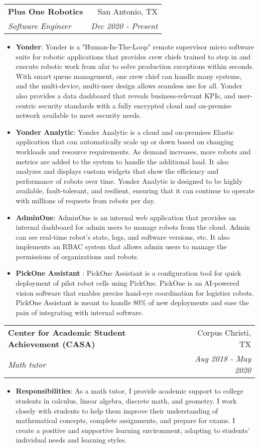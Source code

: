 \documentclass[letterpaper,11pt]{article}
\makeatletter
\newcommand{\resumeItem}[2]{
  \item\small{
    \textbf{#1}{: #2 \vspace{-2pt}}
  }
}
\newcommand{\resumeSubheading}[4]{
  \vspace{-1pt}\item
    \begin{tabular*}{0.97\textwidth}{l@{\extracolsep{\fill}}r}
      \textbf{#1} & #2 \\
      \textit{\small#3} & \textit{\small #4} \\
    \end{tabular*}\vspace{-5pt}
}
\newcommand{\resumeItemListStart}{\begin{itemize}}
\newcommand{\resumeItemListEnd}{\end{itemize}\vspace{-5pt}}
\makeatother
\begin{document}
    \resumeSubheading
      {Plus One Robotics}{San Antonio, TX}
      {Software Engineer}{Dec 2020 - Present}
      \resumeItemListStart
        \resumeItem{Yonder}
          {Yonder is a "Human-In-The-Loop" remote supervisor micro software suite for robotic applications that provides crew chiefs trained to step in and execute robotic work from afar to solve production exceptions within seconds. With smart queue management, one crew chief can handle many systems, and the multi-device, multi-user design allows seamless use for all. Yonder also provides a data dashboard that reveals business-relevant KPIs, and user-centric security standards with a fully encrypted cloud and on-premise network available to meet security needs.}
        \resumeItem{Yonder Analytic}
          {Yonder Analytic is a cloud and on-premises Elastic application that can automatically scale up or down based on changing workloads and resource requirements. As demand increases, more robots and metrics are added to the system to handle the additional load. It also analyzes and displays custom widgets that show the efficiency and performance of robots over time. Yonder Analytic is designed to be highly available, fault-tolerant, and resilient, ensuring that it can continue to operate with millions of requests from robots per day.}
        \resumeItem{AdminOne}
          {AdminOne is an internal web application that provides an internal dashboard for admin users to manage robots from the cloud. Admin can see real-time robot's state, logs, and software versions, etc. It also implements an RBAC system that allows admin users to manage the permissions of organizations and robots.}          
        \resumeItem{PickOne Assistant }
          {PickOne Assistant is a configuration tool for quick deployment of pilot robot cells using PickOne. PickOne is an AI-powered vision software that enables precise hand-eye coordination for logistics robots. PickOne Assistant is meant to handle 80\% of new deployments and ease the pain of integrating with internal software.}
      \resumeItemListEnd

    \resumeSubheading
      {Center for Academic Student Achievement  (CASA)}{Corpus Christi, TX}
      {Math tutor }{Aug 2018 - May 2020}
      \resumeItemListStart
        \resumeItem{Responsibilities}
          {As a math tutor, I provide academic support to college students in calculus, linear algebra, discrete math, and geometry. I work closely with students to help them improve their understanding of mathematical concepts, complete assignments, and prepare for exams. I create a positive and supportive learning environment, adapting to students' individual needs and learning styles.}
      \resumeItemListEnd
\end{document}

